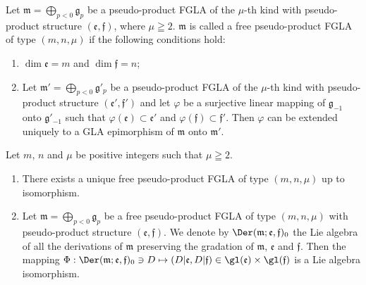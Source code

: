 Let $\mathfrak m=\bigoplus\limits_{p<0}\mathfrak g_p$ be a pseudo-product FGLA
of the $\mu$-th kind with
pseudo-product structure $(\mathfrak e,\mathfrak f)$, where $\mu\geqq2$.
$\mathfrak m$ is called a free pseudo-product FGLA
of type $(m,n,\mu)$ if the following conditions hold:
\begin{enumerate}\itemsep=0pt
\renewcommand{\labelenumi}{$(\roman{enumi})$}
\item $\dim\mathfrak e=m$ and $\dim\mathfrak f=n$;
\item Let $\mathfrak m'=\bigoplus\limits_{p<0}\mathfrak g'_p$ be a pseudo-product FGLA of the $\mu$-th kind with
pseudo-product structure $(\mathfrak e',\mathfrak f')$
and let $\varphi$ be a surjective linear mapping of $\mathfrak g_{-1}$ onto
$\mathfrak g'_{-1}$ such that
$\varphi(\mathfrak e)\subset\mathfrak e'$ and
$\varphi(\mathfrak f)\subset\mathfrak f'$.
Then $\varphi$ can be extended uniquely to a GLA
epimorphism of $\mathfrak m$ onto $\mathfrak m'$.
\end{enumerate}
\begin{proposition}\label{prop8.2} Let $m$, $n$ and $\mu$ be positive integers such that $\mu\geqq2$.
\begin{enumerate}\itemsep=0pt
\item There exists a unique free pseudo-product FGLA
of type
$(m,n,\mu)$ up to isomorphism.
\item Let $\mathfrak m=\bigoplus\limits_{p<0}\mathfrak g_p$ be a free
pseudo-product FGLA of type $(m,n,\mu)$
with pseudo-product structure $(\mathfrak e,\mathfrak f)$.
We denote by $\Der(\mathfrak m;\mathfrak e,\mathfrak f)_0$ the Lie algebra of
all the derivations of $\mathfrak m$ preserving the gradation of $\mathfrak m$, $\mathfrak e$ and $\mathfrak f$.
Then the mapping $\Phi:\Der(\mathfrak m;\mathfrak e,\mathfrak f)_0\ni D\mapsto (D|\mathfrak e,D|\mathfrak f)\in\gl(\mathfrak e)\times\gl(\mathfrak f)$ is a Lie algebra isomorphism.
\end{enumerate}
\end{proposition}

